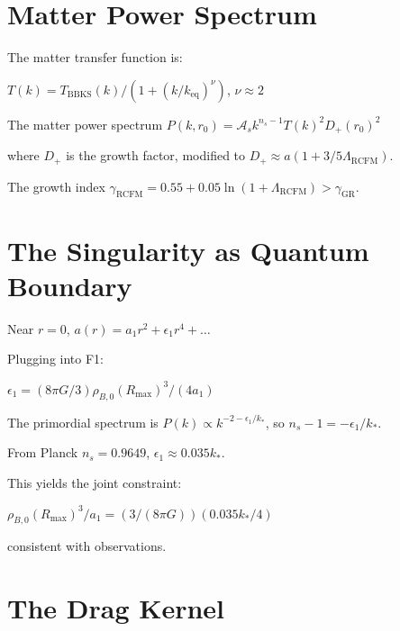 \documentclass[10pt,twocolumn]{article}
\theoremstyle{definition}
\newcommand{\Rmax}{R_{\max}}
\begin{document}
\section{Matter Power Spectrum}
\label{sec:pk}

The matter transfer function is:

\( T(k) = T_{\mathrm{BBKS}}(k) / (1 + (k / k_{\mathrm{eq}})^{\nu}) \), \( \nu \approx 2 \) \citep{Bardeen1986}

The matter power spectrum \( P(k, r_{0}) = \mathcal{A}_{s} k^{n_{s}-1} T(k)^{2} D_{+}(r_{0})^{2} \)

where \( D_{+} \) is the growth factor, modified to \( D_{+} \approx a (1 + 3/5 \Lambda_{\mathrm{RCFM}}) \).

The growth index \( \gamma_{\mathrm{RCFM}} = 0.55 + 0.05 \ln(1 + \Lambda_{\mathrm{RCFM}}) > \gamma_{\mathrm{GR}} \).

\section{The Singularity as Quantum Boundary}
\label{sec:singularity}

Near \( r=0 \), \( a(r) = a_{1} r^{2} + \epsilon_{1} r^{4} + \dots \)

Plugging into F1:

\( \epsilon_{1} = (8 \pi G / 3) \rho_{B,0} (\Rmax)^{3} / (4 a_{1}) \)
  \label{eq:eps1-derived}

The primordial spectrum is \( P(k) \propto k^{-2 - \epsilon_{1} / k_{*}} \), so \( n_{s} - 1 = - \epsilon_{1} / k_{*} \).

From Planck \( n_{s} = 0.9649 \), \( \epsilon_{1} \approx 0.035 k_{*} \).

This yields the joint constraint:

\( \rho_{B,0} (\Rmax)^{3} / a_{1} = (3 / (8 \pi G)) (0.035 k_{*} / 4) \)
\label{eq:joint-constraint}

consistent with observations.

\section{The Drag Kernel}
\label{sec:drag}
\end{document}
